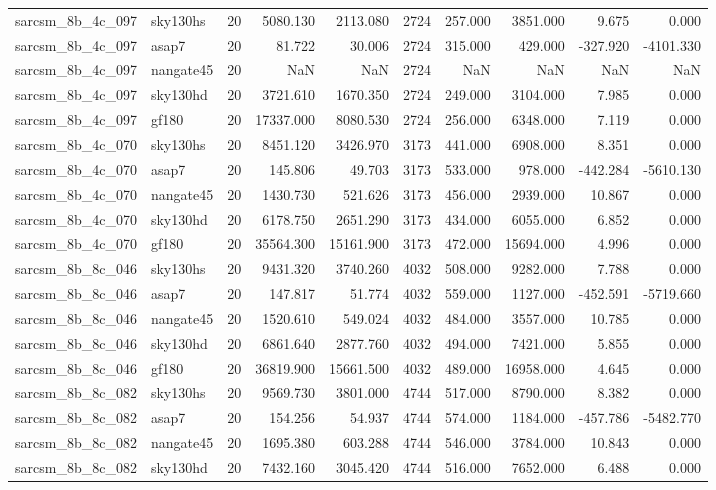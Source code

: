 \begin{tabular}{llrrrrrrrr}
sarcsm\_8b\_4c\_097 & sky130hs & 20 & 5080.130 & 2113.080 & 2724 & 257.000 & 3851.000 & 9.675 & 0.000 \\
sarcsm\_8b\_4c\_097 & asap7 & 20 & 81.722 & 30.006 & 2724 & 315.000 & 429.000 & -327.920 & -4101.330 \\
sarcsm\_8b\_4c\_097 & nangate45 & 20 & NaN & NaN & 2724 & NaN & NaN & NaN & NaN \\
sarcsm\_8b\_4c\_097 & sky130hd & 20 & 3721.610 & 1670.350 & 2724 & 249.000 & 3104.000 & 7.985 & 0.000 \\
sarcsm\_8b\_4c\_097 & gf180 & 20 & 17337.000 & 8080.530 & 2724 & 256.000 & 6348.000 & 7.119 & 0.000 \\
sarcsm\_8b\_4c\_070 & sky130hs & 20 & 8451.120 & 3426.970 & 3173 & 441.000 & 6908.000 & 8.351 & 0.000 \\
sarcsm\_8b\_4c\_070 & asap7 & 20 & 145.806 & 49.703 & 3173 & 533.000 & 978.000 & -442.284 & -5610.130 \\
sarcsm\_8b\_4c\_070 & nangate45 & 20 & 1430.730 & 521.626 & 3173 & 456.000 & 2939.000 & 10.867 & 0.000 \\
sarcsm\_8b\_4c\_070 & sky130hd & 20 & 6178.750 & 2651.290 & 3173 & 434.000 & 6055.000 & 6.852 & 0.000 \\
sarcsm\_8b\_4c\_070 & gf180 & 20 & 35564.300 & 15161.900 & 3173 & 472.000 & 15694.000 & 4.996 & 0.000 \\
sarcsm\_8b\_8c\_046 & sky130hs & 20 & 9431.320 & 3740.260 & 4032 & 508.000 & 9282.000 & 7.788 & 0.000 \\
sarcsm\_8b\_8c\_046 & asap7 & 20 & 147.817 & 51.774 & 4032 & 559.000 & 1127.000 & -452.591 & -5719.660 \\
sarcsm\_8b\_8c\_046 & nangate45 & 20 & 1520.610 & 549.024 & 4032 & 484.000 & 3557.000 & 10.785 & 0.000 \\
sarcsm\_8b\_8c\_046 & sky130hd & 20 & 6861.640 & 2877.760 & 4032 & 494.000 & 7421.000 & 5.855 & 0.000 \\
sarcsm\_8b\_8c\_046 & gf180 & 20 & 36819.900 & 15661.500 & 4032 & 489.000 & 16958.000 & 4.645 & 0.000 \\
sarcsm\_8b\_8c\_082 & sky130hs & 20 & 9569.730 & 3801.000 & 4744 & 517.000 & 8790.000 & 8.382 & 0.000 \\
sarcsm\_8b\_8c\_082 & asap7 & 20 & 154.256 & 54.937 & 4744 & 574.000 & 1184.000 & -457.786 & -5482.770 \\
sarcsm\_8b\_8c\_082 & nangate45 & 20 & 1695.380 & 603.288 & 4744 & 546.000 & 3784.000 & 10.843 & 0.000 \\
sarcsm\_8b\_8c\_082 & sky130hd & 20 & 7432.160 & 3045.420 & 4744 & 516.000 & 7652.000 & 6.488 & 0.000 \\

\end{tabular}
